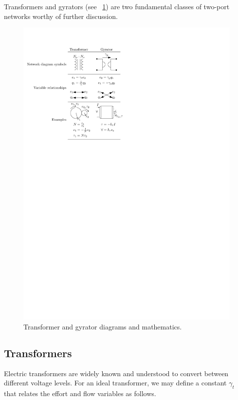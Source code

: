 \documentclass[lettersize,journal]{IEEEtran}
\begin{document}
Transformers and gyrators (see \figurename~\ref{fig:wec_as_multiport_transformer_gyrator}) are two fundamental classes of two-port networks worthy of further discussion.

\begin{figure}[tb]
        \centering
        \includegraphics[width=\columnwidth]{wec_as_multiport_transformer_gyrator.pdf}
        \caption{Transformer and gyrator diagrams and mathematics.}
        \label{fig:wec_as_multiport_transformer_gyrator}
\end{figure}

\subsection{Transformers}\label{sec:trasnformers}
Electric transformers are widely known and understood to convert between different voltage levels.
For an ideal transformer, we may define a constant $\gamma_{t}$ that relates the effort and flow variables as follows.
\end{document}
